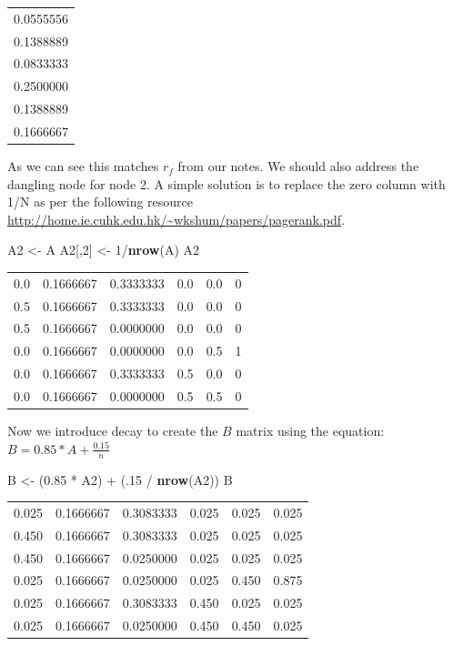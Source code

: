 \documentclass[]{article}
\newenvironment{Shaded}{\begin{snugshade}}{\end{snugshade}}
\newcommand{\KeywordTok}[1]{\textcolor[rgb]{0.13,0.29,0.53}{\textbf{{#1}}}}
\newcommand{\DecValTok}[1]{\textcolor[rgb]{0.00,0.00,0.81}{{#1}}}
\newcommand{\FloatTok}[1]{\textcolor[rgb]{0.00,0.00,0.81}{{#1}}}
\newcommand{\StringTok}[1]{\textcolor[rgb]{0.31,0.60,0.02}{{#1}}}
\newcommand{\NormalTok}[1]{{#1}}
\begin{document}
\begin{longtable}[]{@{}r@{}}
\toprule
0.0555556\tabularnewline
0.1388889\tabularnewline
0.0833333\tabularnewline
0.2500000\tabularnewline
0.1388889\tabularnewline
0.1666667\tabularnewline
\bottomrule
\end{longtable}

As we can see this matches \(r_f\) from our notes. We should also
address the dangling node for node 2. A simple solution is to replace
the zero column with 1/N as per the following resource
\url{http://home.ie.cuhk.edu.hk/~wkshum/papers/pagerank.pdf}.

\begin{Shaded}
\begin{Highlighting}[]
\NormalTok{A2 <-}\StringTok{ }\NormalTok{A}
\NormalTok{A2[,}\DecValTok{2}\NormalTok{] <-}\StringTok{ }\DecValTok{1}\NormalTok{/}\KeywordTok{nrow}\NormalTok{(A)}
\NormalTok{A2}
\end{Highlighting}
\end{Shaded}

\begin{longtable}[]{@{}rrrrrr@{}}
\toprule
0.0 & 0.1666667 & 0.3333333 & 0.0 & 0.0 & 0\tabularnewline
0.5 & 0.1666667 & 0.3333333 & 0.0 & 0.0 & 0\tabularnewline
0.5 & 0.1666667 & 0.0000000 & 0.0 & 0.0 & 0\tabularnewline
0.0 & 0.1666667 & 0.0000000 & 0.0 & 0.5 & 1\tabularnewline
0.0 & 0.1666667 & 0.3333333 & 0.5 & 0.0 & 0\tabularnewline
0.0 & 0.1666667 & 0.0000000 & 0.5 & 0.5 & 0\tabularnewline
\bottomrule
\end{longtable}

\newpage

Now we introduce decay to create the \(B\) matrix using the equation:
\(B = 0.85 * A + \frac{0.15}{n}\)

\begin{Shaded}
\begin{Highlighting}[]
\NormalTok{B <-}\StringTok{ }\NormalTok{(}\FloatTok{0.85} \NormalTok{*}\StringTok{ }\NormalTok{A2) +}\StringTok{ }\NormalTok{(.}\DecValTok{15} \NormalTok{/}\StringTok{ }\KeywordTok{nrow}\NormalTok{(A2))}
\NormalTok{B}
\end{Highlighting}
\end{Shaded}

\begin{longtable}[]{@{}rrrrrr@{}}
\toprule
0.025 & 0.1666667 & 0.3083333 & 0.025 & 0.025 & 0.025\tabularnewline
0.450 & 0.1666667 & 0.3083333 & 0.025 & 0.025 & 0.025\tabularnewline
0.450 & 0.1666667 & 0.0250000 & 0.025 & 0.025 & 0.025\tabularnewline
0.025 & 0.1666667 & 0.0250000 & 0.025 & 0.450 & 0.875\tabularnewline
0.025 & 0.1666667 & 0.3083333 & 0.450 & 0.025 & 0.025\tabularnewline
0.025 & 0.1666667 & 0.0250000 & 0.450 & 0.450 & 0.025\tabularnewline
\bottomrule
\end{longtable}
\end{document}
